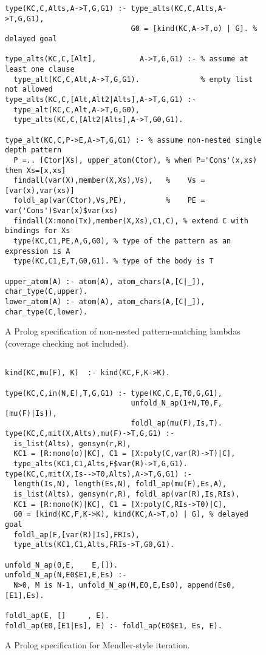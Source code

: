 \documentclass[runningheads,a4paper]{llncs}
\begin{document}
\begin{figure}
\begin{verbatim}
type(KC,C,Alts,A->T,G,G1) :- type_alts(KC,C,Alts,A->T,G,G1),
                             G0 = [kind(KC,A->T,o) | G]. % delayed goal

type_alts(KC,C,[Alt],          A->T,G,G1) :- % assume at least one clause
  type_alt(KC,C,Alt,A->T,G,G1).              % empty list not allowed
type_alts(KC,C,[Alt,Alt2|Alts],A->T,G,G1) :-
  type_alt(KC,C,Alt,A->T,G,G0),
  type_alts(KC,C,[Alt2|Alts],A->T,G0,G1).

type_alt(KC,C,P->E,A->T,G,G1) :- % assume non-nested single depth pattern
  P =.. [Ctor|Xs], upper_atom(Ctor), % when P='Cons'(x,xs) then Xs=[x,xs]
  findall(var(X),member(X,Xs),Vs),   %    Vs = [var(x),var(xs)]  
  foldl_ap(var(Ctor),Vs,PE),         %    PE = var('Cons')$var(x)$var(xs)
  findall(X:mono(Tx),member(X,Xs),C1,C), % extend C with bindings for Xs
  type(KC,C1,PE,A,G,G0), % type of the pattern as an expression is A
  type(KC,C1,E,T,G0,G1). % type of the body is T

upper_atom(A) :- atom(A), atom_chars(A,[C|_]), char_type(C,upper).
lower_atom(A) :- atom(A), atom_chars(A,[C|_]), char_type(C,lower).
\end{verbatim}
\vspace*{-1ex}
\caption{A Prolog specification of non-nested pattern-matching lambdas
$\qquad$ (coverage checking not included).}
\label{fig:patlam}
\end{figure}
\begin{figure}
\begin{verbatim}

kind(KC,mu(F), K)  :- kind(KC,F,K->K).

type(KC,C,in(N,E),T,G,G1) :- type(KC,C,E,T0,G,G1),
                             unfold_N_ap(1+N,T0,F,[mu(F)|Is]),
                             foldl_ap(mu(F),Is,T).
type(KC,C,mit(X,Alts),mu(F)->T,G,G1) :-
  is_list(Alts), gensym(r,R),
  KC1 = [R:mono(o)|KC], C1 = [X:poly(C,var(R)->T)|C],
  type_alts(KC1,C1,Alts,F$var(R)->T,G,G1).
type(KC,C,mit(X,Is-->T0,Alts),A->T,G,G1) :-
  length(Is,N), length(Es,N), foldl_ap(mu(F),Es,A),
  is_list(Alts), gensym(r,R), foldl_ap(var(R),Is,RIs),
  KC1 = [R:mono(K)|KC], C1 = [X:poly(C,RIs->T0)|C],
  G0 = [kind(KC,F,K->K), kind(KC,A->T,o) | G], % delayed goal
  foldl_ap(F,[var(R)|Is],FRIs),
  type_alts(KC1,C1,Alts,FRIs->T,G0,G1).

unfold_N_ap(0,E,    E,[]).
unfold_N_ap(N,E0$E1,E,Es) :-
  N>0, M is N-1, unfold_N_ap(M,E0,E,Es0), append(Es0,[E1],Es).

foldl_ap(E, []     , E).
foldl_ap(E0,[E1|Es], E) :- foldl_ap(E0$E1, Es, E).
\end{verbatim}
\vspace*{-1ex}
\caption{A Prolog specification for Mendler-style iteration.}
\label{fig:mit}
\end{figure}
\end{document}
